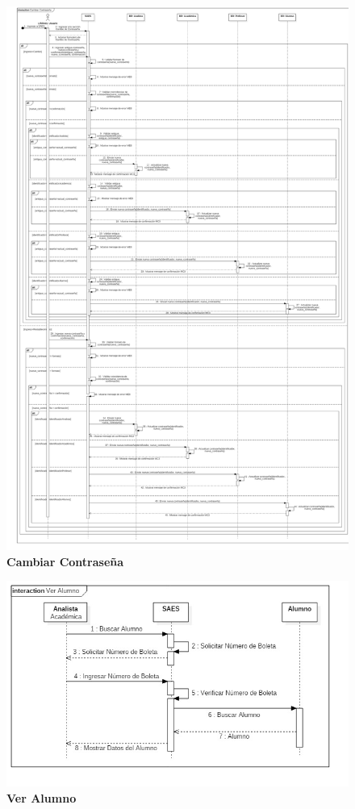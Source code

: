 \begin{figure}[H]
  \centering
    \includegraphics[scale=0.15]{project/Secuencia/Cambiar_Contrasena.jpg}
  \caption{\textbf{Cambiar Contraseña}}
\end{figure}
\begin{figure}[H]
  \centering
    \includegraphics[scale=0.7]{project/Secuencia/Ver_Alumno.jpg}
  \caption{\textbf{Ver Alumno}}
\end{figure}

